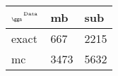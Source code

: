 \begin{tabular}{lll}
    \toprule
    $_{\text{\tiny{\ggn}}}$$^{\text{\tiny{Data}}}$ & mb & sub \\
    \midrule
    exact & 667
              & 2215 \\
    mc   & 3473
              & 5632 \\
    \bottomrule
\end{tabular}